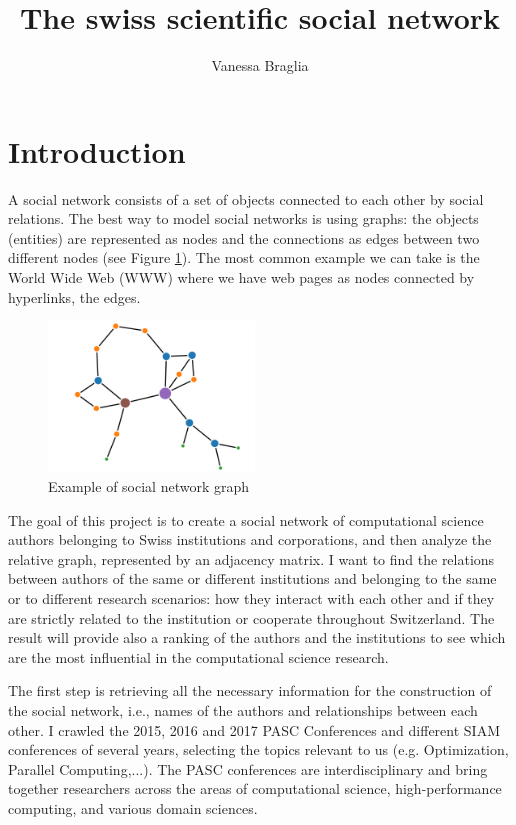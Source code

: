 \documentclass[]{usiinfbachelorproject}
\author{Vanessa Braglia}
\title{The swiss scientific social network}
\begin{document}
\maketitle
\newpage
\tableofcontents
\newpage

\section{Introduction} \label{sec:intro} 

A social network consists of a set of objects connected to each other by social relations. The best way to model social networks is using graphs: the objects (entities) are represented as nodes and the connections as edges between two different nodes (see Figure \ref{fig:socialnetwork}). The most common example we can take is the World Wide Web (WWW) where we have web pages as nodes connected by hyperlinks, the edges.

\begin{figure}[ht]
	\centering
	\includegraphics[height=4cm]{img/graph2.png}
	\caption{Example of social network graph}
	\label{fig:socialnetwork}
\end{figure}

The goal of this project is to create a social network of computational science authors belonging to Swiss institutions and corporations, and then analyze the relative graph, represented by an adjacency matrix. I want to find the relations between authors of the same or different institutions and belonging to the same or to different research scenarios: how they interact with each other and if they are strictly related to the institution or cooperate throughout Switzerland. The result will provide also a ranking of the authors and the institutions to see which are the most influential in the computational science research.

The first step is retrieving all the necessary information for the construction of the social network, i.e., names of the authors and relationships between each other. I crawled the 2015, 2016 and 2017 PASC Conferences and different SIAM conferences of several years, selecting the topics relevant to us (e.g. Optimization, Parallel Computing,...). The PASC conferences are interdisciplinary and bring together researchers across the areas of computational science, high-performance computing, and various domain sciences.
\end{document}
